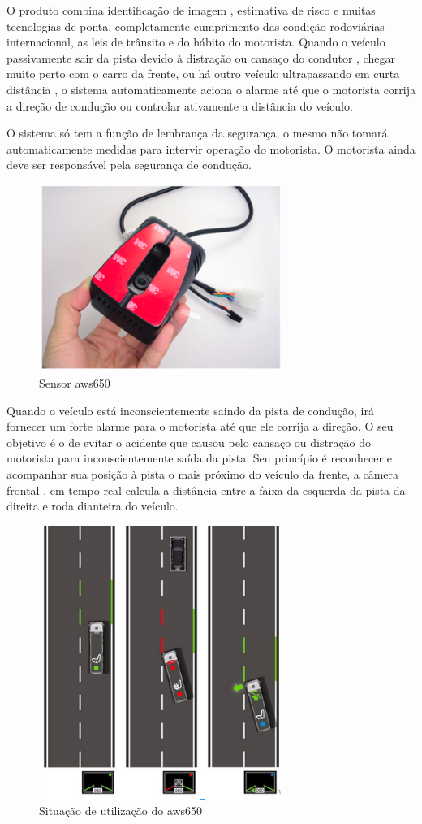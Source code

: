 O produto combina identificação de imagem , estimativa de risco e muitas tecnologias de ponta, completamente cumprimento das condição rodoviárias internacional, as leis de trânsito e do hábito do motorista. Quando o veículo passivamente sair da pista devido à distração ou cansaço do condutor , chegar muito perto com o carro da frente, ou há outro veículo ultrapassando em curta distância , o sistema automaticamente aciona o alarme até que o motorista corrija a direção de condução ou controlar ativamente a distância do  veículo.

O sistema só tem a função de lembrança da segurança, o mesmo não tomará automaticamente medidas para intervir operação do motorista. O motorista ainda deve ser responsável pela segurança de condução.

\begin{figure}[h]
  \centering
  \includegraphics[width=300px, scale=0.5]{figuras/sensoraws650}
  \caption{Sensor aws650}
  \label{fig:sensoraws650}
\end{figure}

Quando o veículo está inconscientemente saindo da pista de condução, irá fornecer um forte alarme para o motorista até que ele corrija a direção. O seu objetivo é o de evitar o acidente que causou pelo cansaço ou distração do motorista para inconscientemente saída da pista. Seu princípio é reconhecer e acompanhar sua posição à pista o mais próximo do veículo da frente, a câmera frontal , em tempo real calcula a distância entre a faixa da esquerda da  pista da direita e roda dianteira do veículo.

\begin{figure}[h]
  \centering
  \includegraphics[width=300px, scale=0.5]{figuras/situacaoPerigo}
  \caption{Situação de utilização do aws650}
  \label{fig:situacaoPerigo}
\end{figure}

